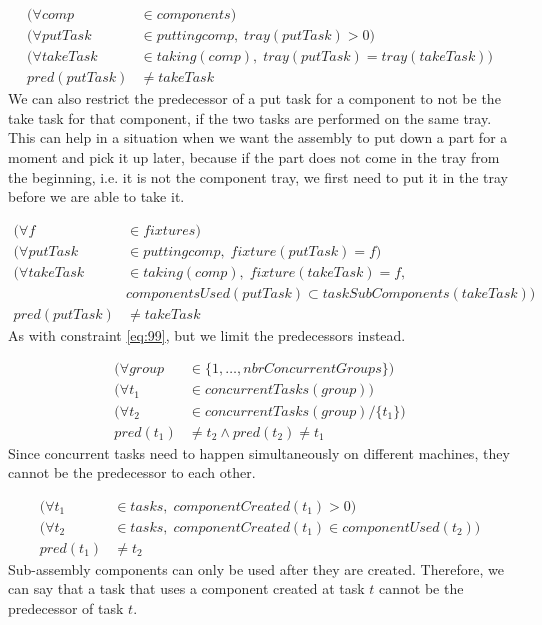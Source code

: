   \begin{equation}
  \begin{aligned}\label{eq:86}
  (\forall comp &\in components) \\
  (\forall putTask &\in putting{comp}, \; tray(putTask) > 0) \\
  (\forall takeTask &\in taking(comp), \; tray(putTask) = tray(takeTask)) \\
  pred(putTask) &\neq takeTask
  \end{aligned}
  \end{equation}
  We can also restrict the predecessor of a put task for a component to not be the take task for that component, if the two tasks are performed on the same tray. This can help in a situation when we want the assembly to put down a part for a moment and pick it up later, because if the part does not come in the tray from the beginning, i.e. it is not the component tray, we first need to put it in the tray before we are able to take it. 
  
  \begin{equation}
  \begin{aligned}\label{eq:87}
  (\forall f &\in fixtures) \\
  (\forall putTask &\in putting{comp}, \; fixture(putTask) = f) \\
  (\forall takeTask &\in taking(comp), \; fixture(takeTask) = f,\\
  &componentsUsed(putTask) \subset taskSubComponents(takeTask))\\
  pred(putTask) &\neq takeTask
  \end{aligned}
  \end{equation}
  As with constraint \ref{eq:99}, but we limit the predecessors instead.
  
  \begin{equation}
  \begin{aligned}\label{eq:88}
  (\forall group &\in \{1 , \ldots , nbrConcurrentGroups\}) \\
  (\forall t_1 &\in concurrentTasks(group)) \\
  (\forall t_2 &\in concurrentTasks(group) / \{t_1\}) \\
  pred(t_1) &\neq t_2 \land pred(t_2) \neq t_1
  \end{aligned}
  \end{equation}
  Since concurrent tasks need to happen simultaneously on different machines, they cannot be the predecessor to each other.
  
  \begin{equation}
  \begin{aligned}\label{eq:89}
  (\forall t_1 &\in tasks, \; componentCreated(t_1) > 0) \\
  (\forall t_2 &\in tasks, \; componentCreated(t_1) \in componentUsed(t_2)) \\
  pred(t_1) &\neq t_2
  \end{aligned}
  \end{equation}
 Sub-assembly components can only be used after they are created. Therefore, we can say that a task that uses a component created at task $t$ cannot be the predecessor of task $t$.
  
